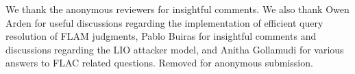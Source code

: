 \ifx\review\undefined
We thank the anonymous reviewers for insightful comments. We also thank Owen Arden for useful discussions regarding the implementation of efficient query resolution of FLAM judgments, Pablo Buiras for insightful comments and discussions regarding the LIO attacker model, and Anitha Gollamudi for various answers to FLAC related questions.
\else
Removed for anonymous submission.
\fi
